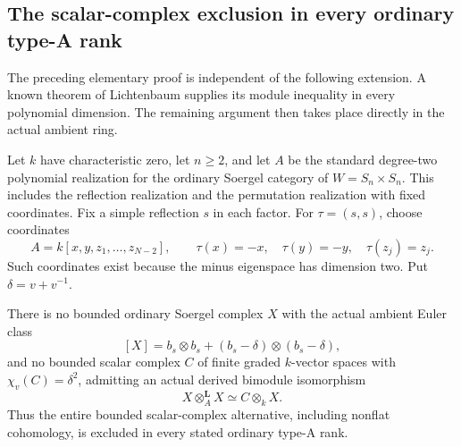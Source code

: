 \subsection{The scalar-complex exclusion in every ordinary type-A rank}

The preceding elementary proof is independent of the
following extension. A known theorem of Lichtenbaum
supplies its module inequality in every polynomial
dimension. The remaining argument then takes place
directly in the actual ambient ring.

Let \(k\) have characteristic zero, let \(n\ge2\), and
let \(A\) be the standard degree-two polynomial
realization for the ordinary Soergel category of
\(W=S_n\times S_n\). This includes the reflection
realization and the permutation realization with
fixed coordinates. Fix a simple reflection \(s\)
in each factor. For \(\tau=(s,s)\), choose coordinates
\[
 A=k[x,y,z_1,\ldots,z_{N-2}],\qquad
 \tau(x)=-x,\quad \tau(y)=-y,\quad\tau(z_j)=z_j.
\]
Such coordinates exist because the minus eigenspace
has dimension two. Put \(\delta=v+v^{-1}\).

\begin{finding}
\label{f:allRankScalarClosure}
There is no bounded ordinary Soergel complex \(X\)
with the actual ambient Euler class
\[
 [X]=b_s\otimes b_s+(b_s-\delta)\otimes(b_s-\delta),
\]
and no bounded scalar complex \(C\) of finite graded
\(k\)-vector spaces with \(\chi_v(C)=\delta^2\),
admitting an actual derived bimodule isomorphism
\begin{equation}\label{eq:allRankScalarQuadratic}
 X\otimes_A^{\mathbf L}X\simeq C\otimes_kX.
\end{equation}
Thus the entire bounded scalar-complex alternative,
including nonflat cohomology, is excluded in every
stated ordinary type-A rank.
\end{finding}

